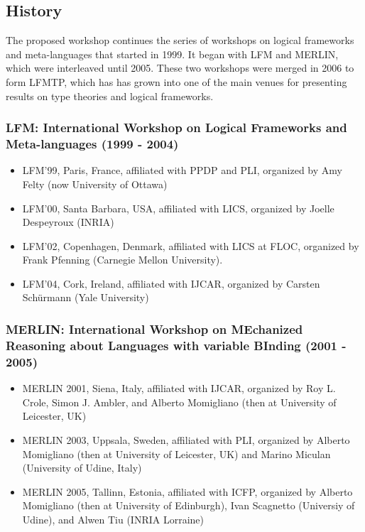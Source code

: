\documentclass{article}
\begin{document}
\subsection{History}

  The proposed workshop continues the series of workshops on logical
  frameworks and meta-languages that started in 1999. It began with
  LFM and MERLIN, which were interleaved until 2005. These two
  workshops were merged in 2006 to form LFMTP, which has has grown
  into one of the main venues for presenting results on type theories
  and logical frameworks.

\subsubsection{LFM: International Workshop on Logical Frameworks and Meta-languages (1999 - 2004)}

\begin{itemize}
\item LFM'99, Paris, France, affiliated with PPDP and PLI, organized by
     Amy Felty (now University of Ottawa)

\item LFM'00, Santa Barbara, USA, affiliated with LICS, organized by
     Joelle Despeyroux (INRIA)

\item LFM'02, Copenhagen, Denmark, affiliated with LICS at FLOC,
     organized by Frank Pfenning (Carnegie Mellon University).

\item LFM'04, Cork, Ireland, affiliated with IJCAR, organized by
     Carsten Schürmann (Yale University)
\end{itemize}
   
\subsubsection{MERLIN: International Workshop on MEchanized Reasoning about Languages with variable BInding (2001 - 2005)}

\begin{itemize}
\item MERLIN 2001, Siena, Italy, affiliated with IJCAR, organized by
     Roy L. Crole, Simon J. Ambler, and Alberto Momigliano (then at
     University of Leicester, UK)

\item MERLIN 2003, Uppsala, Sweden, affiliated with PLI, organized by
     Alberto Momigliano (then at University of Leicester, UK) and
     Marino Miculan (University of Udine, Italy)

\item MERLIN 2005, Tallinn, Estonia, affiliated with ICFP, organized by
     Alberto Momigliano (then at University of Edinburgh), Ivan
     Scagnetto (Universiy of Udine), and Alwen Tiu (INRIA Lorraine)
\end{itemize}
   
\end{document}
